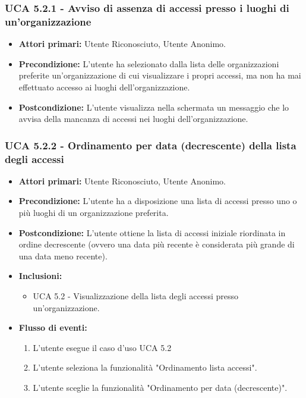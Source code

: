 \subsubsection{UCA 5.2.1 - Avviso di assenza di accessi presso i luoghi di un’organizzazione}
\begin{itemize}
    \item \textbf{Attori primari:} Utente Riconosciuto, Utente Anonimo.
    \item \textbf{Precondizione:} L'utente ha selezionato dalla lista delle organizzazioni preferite un'organizzazione di cui visualizzare i propri accessi, ma non ha mai effettuato accesso ai luoghi dell'organizzazione.
    \item \textbf{Postcondizione:} L'utente visualizza nella schermata un messaggio che lo avvisa della mancanza di accessi nei luoghi dell'organizzazione.
\end{itemize}

\subsubsection{UCA 5.2.2 - Ordinamento per data (decrescente) della lista degli accessi}
\begin{itemize}
    \item \textbf{Attori primari:} Utente Riconosciuto, Utente Anonimo.
    \item \textbf{Precondizione:} L’utente ha a disposizione una lista di accessi presso uno o più luoghi di un organizzazione preferita.
    \item \textbf{Postcondizione:} L’utente ottiene la lista di accessi iniziale riordinata in ordine decrescente (ovvero una data più recente è considerata più grande di una data meno recente).
    \item \textbf{Inclusioni:} %
    \begin{itemize}
        \item UCA 5.2 - Visualizzazione della lista degli accessi presso un'organizzazione.
    \end{itemize}
    \item \textbf{Flusso di eventi:}
    \begin{enumerate}
        \item L'utente esegue il caso d'uso UCA 5.2
        \item L'utente seleziona la funzionalità "Ordinamento lista accessi".
        \item L'utente sceglie la funzionalità "Ordinamento per data (decrescente)".
    \end{enumerate}
\end{itemize}

